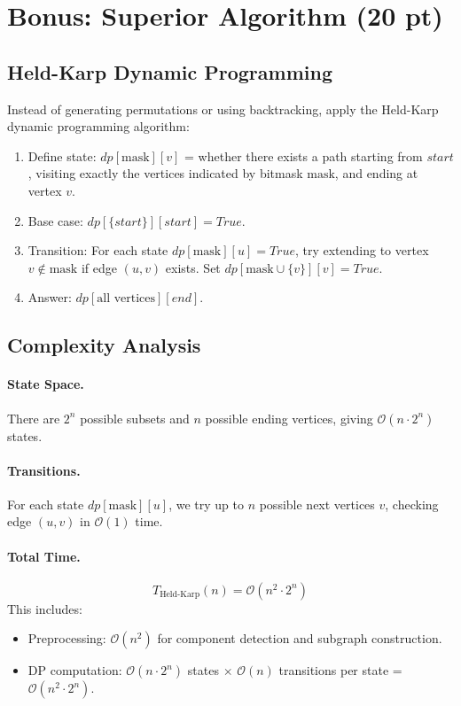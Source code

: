 \documentclass[11pt]{article}
\begin{document}
\section*{Bonus: Superior Algorithm (20 pt)}

\subsection*{Held-Karp Dynamic Programming}
Instead of generating permutations or using backtracking, apply the Held-Karp dynamic programming algorithm:
\begin{enumerate}[label=\arabic*.]
	\item Define state: $\textit{dp}[\text{mask}][v]$ = whether there exists a path starting from $\textit{start}$, visiting exactly the vertices indicated by bitmask $\text{mask}$, and ending at vertex $v$.
	\item Base case: $\textit{dp}[\{start\}][start] = \textit{True}$.
	\item Transition: For each state $\textit{dp}[\text{mask}][u] = \textit{True}$, try extending to vertex $v \notin \text{mask}$ if edge $(u,v)$ exists. Set $\textit{dp}[\text{mask} \cup \{v\}][v] = \textit{True}$.
	\item Answer: $\textit{dp}[\text{all vertices}][end]$.
\end{enumerate}

\subsection*{Complexity Analysis}
\paragraph{State Space.} There are $2^n$ possible subsets and $n$ possible ending vertices, giving $\mathcal{O}(n \cdot 2^n)$ states.

\paragraph{Transitions.} For each state $\textit{dp}[\text{mask}][u]$, we try up to $n$ possible next vertices $v$, checking edge $(u,v)$ in $\mathcal{O}(1)$ time.

\paragraph{Total Time.}
\[
T_{\text{Held-Karp}}(n) = \mathcal{O}(n^2 \cdot 2^n)
\]
This includes:
\begin{itemize}[left=1.2em]
	\item Preprocessing: $\mathcal{O}(n^2)$ for component detection and subgraph construction.
	\item DP computation: $\mathcal{O}(n \cdot 2^n)$ states $\times$ $\mathcal{O}(n)$ transitions per state = $\mathcal{O}(n^2 \cdot 2^n)$.
\end{itemize}
\end{document}
